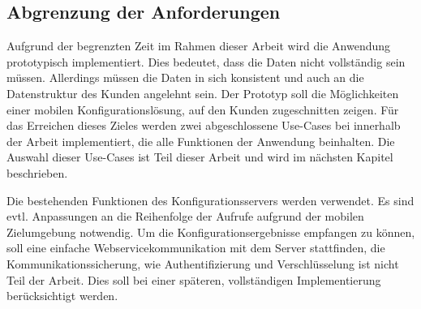 \subsection{Abgrenzung der Anforderungen}
Aufgrund der begrenzten Zeit im Rahmen dieser Arbeit wird die Anwendung prototypisch implementiert. Dies bedeutet, dass die Daten nicht vollständig sein müssen. Allerdings müssen die Daten in sich konsistent und auch an die Datenstruktur des Kunden angelehnt sein. Der Prototyp soll die Möglichkeiten einer mobilen Konfigurationslösung, auf den Kunden zugeschnitten zeigen. Für das Erreichen dieses Zieles werden zwei abgeschlossene Use-Cases bei innerhalb der Arbeit implementiert, die alle Funktionen der Anwendung beinhalten. Die Auswahl dieser Use-Cases ist Teil dieser Arbeit und wird im nächsten Kapitel beschrieben. \par

 Die bestehenden Funktionen des Konfigurationsservers werden verwendet. Es sind evtl. Anpassungen an die Reihenfolge der Aufrufe aufgrund der mobilen Zielumgebung notwendig. Um die Konfigurationsergebnisse empfangen zu können, soll eine einfache Webservicekommunikation mit dem Server stattfinden, die Kommunikationssicherung, wie Authentifizierung und Verschlüsselung ist nicht Teil der Arbeit. Dies soll bei einer späteren, vollständigen Implementierung berücksichtigt werden.

